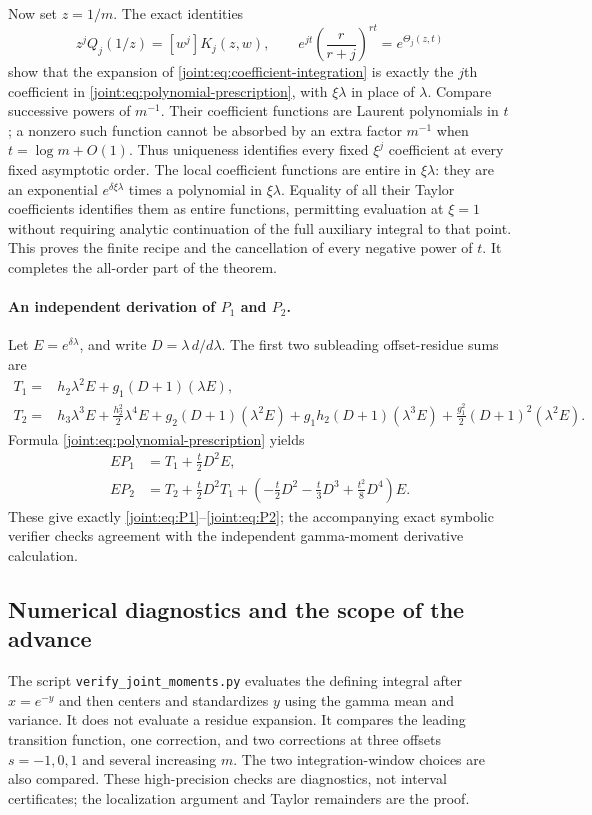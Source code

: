 Now set $z=1/m$. The exact identities
\[
 z^jQ_j(1/z)=[w^j]K_j(z,w),\qquad
 e^{jt}\left(\frac r{r+j}\right)^{rt}=e^{\Theta_j(z,t)}
\]
show that the expansion of \eqref{joint:eq:coefficient-integration}
is exactly the $j$th coefficient in
\eqref{joint:eq:polynomial-prescription}, with $\xi\lambda$ in place
of $\lambda$. Compare successive powers of $m^{-1}$.
Their coefficient functions are Laurent polynomials in $t$;
a nonzero such function cannot be absorbed by an extra factor
$m^{-1}$ when $t=\log m+O(1)$. Thus uniqueness identifies every
fixed $\xi^j$ coefficient at every fixed asymptotic order.
The local coefficient functions are entire in $\xi\lambda$:
they are an exponential $e^{\delta\xi\lambda}$ times a polynomial
in $\xi\lambda$. Equality of all their Taylor coefficients identifies
them as entire functions, permitting evaluation at $\xi=1$ without
requiring analytic continuation of the full auxiliary integral to
that point. This proves the finite recipe and the cancellation of
every negative power of $t$.
It completes the all-order part of the theorem.

\paragraph{An independent derivation of $P_1$ and $P_2$.}
Let $E=e^{\delta\lambda}$, and write $D=\lambda\,d/d\lambda$.
The first two subleading offset-residue sums are
\begin{align*}
 T_1={}&h_2\lambda^2E+g_1(D+1)(\lambda E),\\
 T_2={}&h_3\lambda^3E+\frac{h_2^2}{2}\lambda^4E
   +g_2(D+1)(\lambda^2E)
   +g_1h_2(D+1)(\lambda^3E)
   +\frac{g_1^2}{2}(D+1)^2(\lambda^2E).
\end{align*}
Formula \eqref{joint:eq:polynomial-prescription} yields
\begin{align*}
 EP_1&=T_1+\frac t2D^2E,\\
 EP_2&=T_2+\frac t2D^2T_1
       +\left(-\frac t2D^2-\frac t3D^3+\frac{t^2}{8}D^4\right)E.
\end{align*}
These give exactly \eqref{joint:eq:P1}--\eqref{joint:eq:P2}; the
accompanying exact symbolic verifier checks agreement with the
independent gamma-moment derivative calculation.

\subsection{Numerical diagnostics and the scope of the advance}

The script \texttt{verify\_joint\_moments.py} evaluates the defining
integral after $x=e^{-y}$ and then centers and standardizes $y$ using
the gamma mean and variance. It does not evaluate a residue expansion.
It compares the leading transition function, one correction, and two
corrections at three offsets $s=-1,0,1$ and several increasing $m$.
The two integration-window choices are also compared.
These high-precision checks are diagnostics, not interval certificates;
the localization argument and Taylor remainders are the proof.

